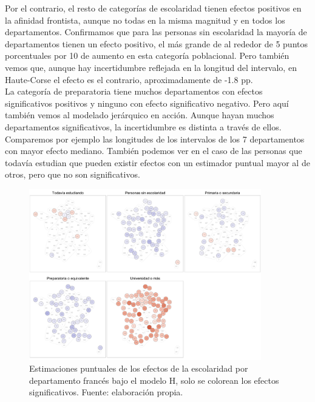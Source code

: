 Por el contrario, el resto de categorías de escolaridad tienen efectos positivos en la afinidad frontista, aunque no todas en la misma magnitud y en todos los departamentos. Confirmamos que para las personas sin escolaridad la mayoría de departamentos tienen un efecto positivo, el más grande de al rededor de 5 puntos porcentuales por 10 de aumento en esta categoría poblacional. Pero también vemos que, aunque hay incertidumbre reflejada en la longitud del intervalo, en Haute-Corse el efecto es el contrario, aproximadamente de -1.8 pp.\\ 

La categoría de preparatoria tiene muchos departamentos con efectos significativos positivos y ninguno con efecto significativo negativo. Pero aquí también vemos al modelado jerárquico en acción. Aunque hayan muchos departamentos significativos, la incertidumbre es distinta a través de ellos. Comparemos por ejemplo las longitudes de los intervalos de los 7 departamentos con mayor efecto mediano. También podemos ver en el caso de las personas que todavía estudian que pueden existir efectos con un estimador puntual mayor al de otros, pero que no son significativos.\\

\begin{figure}
	\centering
	\includegraphics[width = 0.9\textwidth]{Figs/Efectos/Dorling_Efectos_Escolaridad_Modelo_H}
	\caption{Estimaciones puntuales de los efectos de la escolaridad por departamento francés bajo el modelo H, solo se colorean los efectos significativos. Fuente: elaboración propia.}
	\label{fig:Dorling_Efectos_Escolaridad}
\end{figure}

